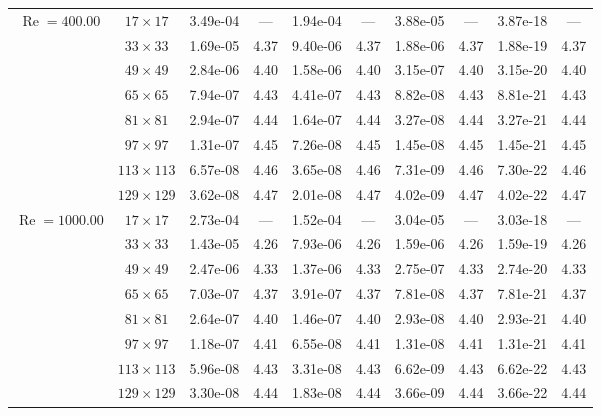 \documentclass[preprint, 12pt]{elsarticle}
\begin{document}
\begin{center}
\begin{table}[H]
{\begin{tabular*}{\textwidth}{@{\extracolsep\fill}cccccccccc@{}}
    \hline
    \multirow{7}{*}{$\operatorname{Re}=400.00$} & $17\times 17$ & 3.49e-04 & --- & 1.94e-04 & --- & 3.88e-05 & --- & 3.87e-18 & --- \\
    & $33\times 33$ & 1.69e-05 & 4.37 & 9.40e-06 & 4.37 & 1.88e-06 & 4.37 & 1.88e-19 & 4.37 \\
    & $49\times 49$ & 2.84e-06 & 4.40 & 1.58e-06 & 4.40 & 3.15e-07 & 4.40 & 3.15e-20 & 4.40 \\
    \multirow{3}{*}{$\operatorname{Wi}=10$} & $65\times 65$ & 7.94e-07 & 4.43 & 4.41e-07 & 4.43 & 8.82e-08 & 4.43 & 8.81e-21 & 4.43 \\
    & $81\times 81$ & 2.94e-07 & 4.44 & 1.64e-07 & 4.44 & 3.27e-08 & 4.44 & 3.27e-21 & 4.44 \\
    & $97\times 97$ & 1.31e-07 & 4.45 & 7.26e-08 & 4.45 & 1.45e-08 & 4.45 & 1.45e-21 & 4.45 \\
    & $113\times 113$ & 6.57e-08 & 4.46 & 3.65e-08 & 4.46 & 7.31e-09 & 4.46 & 7.30e-22 & 4.46 \\
    & $129\times 129$ & 3.62e-08 & 4.47 & 2.01e-08 & 4.47 & 4.02e-09 & 4.47 & 4.02e-22 & 4.47 \\
    \hline
    \multirow{7}{*}{$\operatorname{Re}=1000.00$} & $17\times 17$ & 2.73e-04 & --- & 1.52e-04 & --- & 3.04e-05 & --- & 3.03e-18 & --- \\
    & $33\times 33$ & 1.43e-05 & 4.26 & 7.93e-06 & 4.26 & 1.59e-06 & 4.26 & 1.59e-19 & 4.26 \\
    & $49\times 49$ & 2.47e-06 & 4.33 & 1.37e-06 & 4.33 & 2.75e-07 & 4.33 & 2.74e-20 & 4.33 \\
    \multirow{3}{*}{$\operatorname{Wi}=10$} & $65\times 65$ & 7.03e-07 & 4.37 & 3.91e-07 & 4.37 & 7.81e-08 & 4.37 & 7.81e-21 & 4.37 \\
    & $81\times 81$ & 2.64e-07 & 4.40 & 1.46e-07 & 4.40 & 2.93e-08 & 4.40 & 2.93e-21 & 4.40 \\
    & $97\times 97$ & 1.18e-07 & 4.41 & 6.55e-08 & 4.41 & 1.31e-08 & 4.41 & 1.31e-21 & 4.41 \\
    & $113\times 113$ & 5.96e-08 & 4.43 & 3.31e-08 & 4.43 & 6.62e-09 & 4.43 & 6.62e-22 & 4.43 \\
    & $129\times 129$ & 3.30e-08 & 4.44 & 1.83e-08 & 4.44 & 3.66e-09 & 4.44 & 3.66e-22 & 4.44 \\
    \hline
    \end{tabular*}
}
\end{table}
\end{center}
\end{document}
